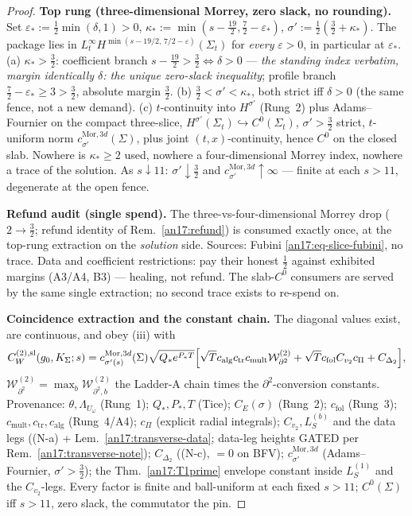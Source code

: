 \begin{proof}
\medskip\noindent
\textbf{Top rung (three-dimensional Morrey, zero slack, no rounding).} Set
$\varepsilon_*:=\tfrac12\min(\delta,1)>0$,
$\kappa_*:=\min(s-\tfrac{19}2,\tfrac72-\varepsilon_*)$,
$\sigma':=\tfrac12(\tfrac32+\kappa_*)$. The package lies in
$L^\infty_t H^{\min(s-19/2,\,7/2-\varepsilon)}(\Sigma_t)$ for \emph{every}
$\varepsilon>0$, in particular at $\varepsilon_*$. (a) $\kappa_*>\tfrac32$:
coefficient branch $s-\tfrac{19}2>\tfrac32\iff\delta>0$ --- \emph{the standing
index verbatim, margin identically $\delta$: the unique zero-slack inequality};
profile branch $\tfrac72-\varepsilon_*\ge3>\tfrac32$, absolute margin
$\tfrac32$. (b) $\tfrac32<\sigma'<\kappa_*$, both strict iff $\delta>0$ (the same
fence, not a new demand). (c) $t$-continuity into $H^{\sigma'}$ (Rung~2) plus
Adams--Fournier on the compact three-slice,
$H^{\sigma'}(\Sigma_t)\hookrightarrow C^0(\Sigma_t)$, $\sigma'>\tfrac32$ strict,
$t$-uniform norm $c^{\mathrm{Mor},3d}_{\sigma'}(\Sigma)$, plus joint
$(t,x)$-continuity, hence $C^0$ on the closed slab. Nowhere is $\kappa_*\ge2$
used, nowhere a four-dimensional Morrey index, nowhere a trace of the solution.
As $s\downarrow11$: $\sigma'\downarrow\tfrac32$ and
$c^{\mathrm{Mor},3d}_{\sigma'}\uparrow\infty$ --- finite at each $s>11$,
degenerate at the open fence.

\medskip\noindent
\textbf{Refund audit (single spend).} The three-vs-four-dimensional Morrey drop
($2\to\tfrac32$; refund identity of Rem.~\ref{an17:refund}) is consumed exactly
once, at the top-rung extraction on the \emph{solution} side. Sources: Fubini
\eqref{an17:eq-slice-fubini}, no trace. Data and coefficient restrictions: pay
their honest $\tfrac12$ against exhibited margins (A3/A4, B3) --- healing, not
refund. The slab-$C^0$ consumers are served by the same single extraction; no
second trace exists to re-spend on.

\medskip\noindent
\textbf{Coincidence extraction and the constant chain.} The diagonal values
exist, are continuous, and obey (iii) with
\begin{equation}\label{an17:eq-slice-CW}
 C^{(2),\mathrm{sl}}_W(g_0,K_\Sigma;s)=
 c^{\mathrm{Mor},3d}_{\sigma'(s)}(\Sigma)\sqrt{Q_*e^{P_*T}}
 \Bigl[\sqrt T c_{\mathrm{alg}}c_{\mathrm{tr}}c_{\mathrm{mult}}
 \mathcal W^{(2)}_{\partial^2}
 +\sqrt T c_{\mathrm{fol}}C_{v_2}c_\Pi+C_{\Delta_2}\Bigr],
\end{equation}
$\mathcal W^{(2)}_{\partial^2}=\max_b\mathcal W^{(2)}_{\partial^2,b}$ the
Ladder-A chain times the $\partial^2$-conversion constants. Provenance:
$\theta,\Lambda_{U_\omega}$ (Rung~1); $Q_*,P_*,T$ (Tice); $C_E(\sigma)$
(Rung~2); $c_{\mathrm{fol}}$ (Rung~3); $c_{\mathrm{mult}},c_{\mathrm{tr}},
c_{\mathrm{alg}}$ (Rung~4/A4); $c_\Pi$ (explicit radial integrals);
$C_{v_2},L^{(b)}_S$ and the data legs (\textup{(N-a)} +
Lem.~\ref{an17:transverse-data}; data-leg heights GATED per
Rem.~\ref{an17:transverse-note}); $C_{\Delta_2}$ (\textup{(N-c)}, $=0$ on BFV);
$c^{\mathrm{Mor},3d}_{\sigma'}$ (Adams--Fournier, $\sigma'>\tfrac32$); the
Thm.~\ref{an17:T1prime} envelope constant inside $L^{(1)}_S$ and the
$C_{v_2}$-legs. Every factor is finite and ball-uniform at each fixed $s>11$;
$C^0(\Sigma)$ iff $s>11$, zero slack, the commutator the pin.
\end{proof}

